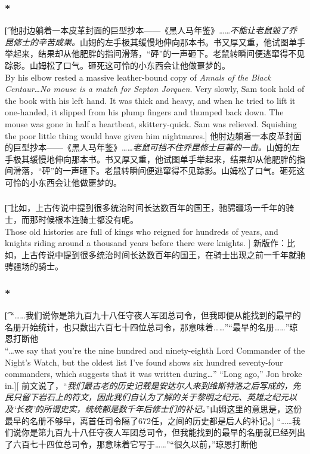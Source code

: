 \documentclass[12pt,a4paper]{article}
\begin{document}
\subsubsection{\color{red}*}\t[	
	他肘边躺着一本皮革封面的巨型抄本——《黑人马年鉴》……\emph{不能让老鼠毁了乔昆修士的辛苦成果。}山姆的左手极其缓慢地伸向那本书。书又厚又重，他试图单手举起来，结果却从他肥胖的指间滑落，“砰”的一声砸下。老鼠转瞬间便逃窜得不见踪影。山姆松了口气。砸死这可怜的小东西会让他做噩梦的。\\
	By his elbow rested a massive leather-bound copy of \emph{Annals of the Black Centaur}\ldots\emph{No mouse is a match for Septon Jorquen}. Very slowly, Sam took hold of the book with his left hand. It was thick and heavy, and when he tried to lift it one-handed, it slipped from his plump fingers and thumped back down. The mouse was gone in half a heartbeat, skittery-quick. Sam was relieved. Squishing the poor little thing would have given him nightmares.]
	他肘边躺着一本皮革封面的巨型抄本——《黑人马年鉴》……\emph{老鼠可挡不住乔昆修士巨著的一击。}山姆的左手极其缓慢地伸向那本书。书又厚又重，他试图单手举起来，结果却从他肥胖的指间滑落，“砰”的一声砸下。老鼠转瞬间便逃窜得不见踪影。山姆松了口气。砸死这可怜的小东西会让他做噩梦的。\\
	
	
\subsubsection{}\t[
	比如，上古传说中提到很多统治时间长达数百年的国王，驰骋疆场一千年的骑士，而那时候根本连骑士都没有呢。\\
	Those old histories are full of kings who reigned for hundreds of years, and knights riding around a thousand years before there were knights. ]
	新版作：比如，上古传说中提到很多统治时间长达数百年的国王，在骑士出现之前一千年就驰骋疆场的骑士。
	
\subsubsection{\color{red}*}\t[
	“……我们说你是第九百九十八任守夜人军团总司令，但我即便从能找到的最早的名册开始统计，也只数出六百七十四位总司令，那意味着……”“最早的名册……”琼恩打断他\\
	“\ldots we say that you're the nine hundred and ninety-eighth Lord Commander of the Night's Watch, but the oldest list I've found shows six hundred seventy-four commanders, which suggests that it was written during\ldots” “Long ago,” Jon broke in.][
	前文说了，“\emph{我们最古老的历史记载是安达尔人来到维斯特洛之后写成的，先民只留下岩石上的符文，因此我们自认为了解的关于黎明之纪元、英雄之纪元以及‘长夜’的所谓史实，统统都是数千年后修士们的补记。}”山姆这里的意思是，这份最早的名册不够早，离首任司令隔了672任，之间的历史都是后人的补记。]
	“……我们说你是第九百九十八任守夜人军团总司令，但我能找到的最早的名册就已经列出了六百七十四位总司令，那意味着它写于……”“很久以前，”琼恩打断他
	
\end{document}
